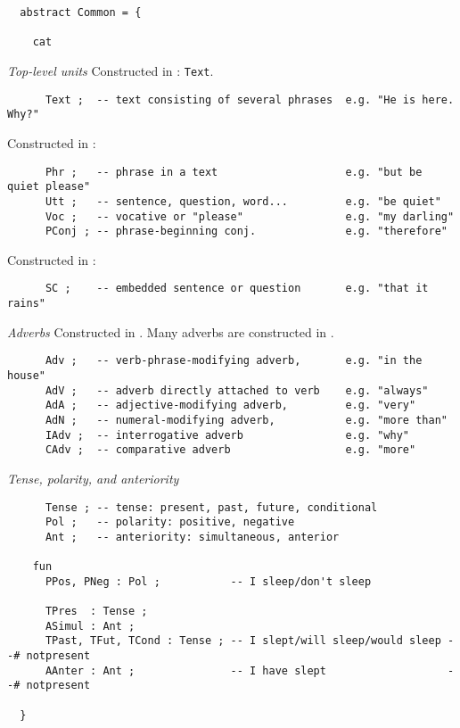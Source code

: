 \documentclass[11pt,a4paper]{article}
\newcommand{\subsubsubsection}[1]{\textit{#1}}
\begin{document}
\begin{verbatim}
  abstract Common = {
  
    cat
\end{verbatim}

\subsubsubsection{Top-level units}
Constructed in : \texttt{Text}.

\begin{verbatim}
      Text ;  -- text consisting of several phrases  e.g. "He is here. Why?"
\end{verbatim}

Constructed in :

\begin{verbatim}
      Phr ;   -- phrase in a text                    e.g. "but be quiet please"
      Utt ;   -- sentence, question, word...         e.g. "be quiet"
      Voc ;   -- vocative or "please"                e.g. "my darling"
      PConj ; -- phrase-beginning conj.              e.g. "therefore"
\end{verbatim}

Constructed in :

\begin{verbatim}
      SC ;    -- embedded sentence or question       e.g. "that it rains"
\end{verbatim}

\subsubsubsection{Adverbs}
Constructed in .  
Many adverbs are constructed in .

\begin{verbatim}
      Adv ;   -- verb-phrase-modifying adverb,       e.g. "in the house"
      AdV ;   -- adverb directly attached to verb    e.g. "always"
      AdA ;   -- adjective-modifying adverb,         e.g. "very"
      AdN ;   -- numeral-modifying adverb,           e.g. "more than"
      IAdv ;  -- interrogative adverb                e.g. "why"
      CAdv ;  -- comparative adverb                  e.g. "more"
\end{verbatim}

\subsubsubsection{Tense, polarity, and anteriority}
\begin{verbatim}
      Tense ; -- tense: present, past, future, conditional
      Pol ;   -- polarity: positive, negative
      Ant ;   -- anteriority: simultaneous, anterior
  
    fun
      PPos, PNeg : Pol ;           -- I sleep/don't sleep
  
      TPres  : Tense ;                
      ASimul : Ant ;
      TPast, TFut, TCond : Tense ; -- I slept/will sleep/would sleep --# notpresent
      AAnter : Ant ;               -- I have slept                   --# notpresent
  
  }
\end{verbatim}
\end{document}
